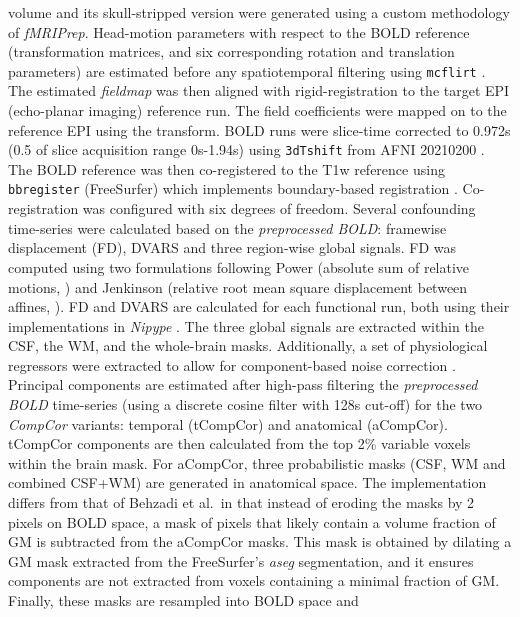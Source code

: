 \documentclass[
]{article}
\begin{document}
\begin{description}
volume and its skull-stripped version were generated using a custom
methodology of \emph{fMRIPrep}. Head-motion parameters with respect to
the BOLD reference (transformation matrices, and six corresponding
rotation and translation parameters) are estimated before any
spatiotemporal filtering using \texttt{mcflirt} \citep[FSL
6.0.4:ddd0a010,][]{mcflirt}. The estimated \emph{fieldmap} was then
aligned with rigid-registration to the target EPI (echo-planar imaging)
reference run. The field coefficients were mapped on to the reference
EPI using the transform. BOLD runs were slice-time corrected to 0.972s
(0.5 of slice acquisition range 0s-1.94s) using \texttt{3dTshift} from
AFNI 20210200 \citep[RRID:SCR\_005927]{afni}. The BOLD reference was
then co-registered to the T1w reference using \texttt{bbregister}
(FreeSurfer) which implements boundary-based registration \citep{bbr}.
Co-registration was configured with six degrees of freedom. Several
confounding time-series were calculated based on the \emph{preprocessed
BOLD}: framewise displacement (FD), DVARS and three region-wise global
signals. FD was computed using two formulations following Power
(absolute sum of relative motions, \citet{power_fd_dvars}) and Jenkinson
(relative root mean square displacement between affines,
\citet{mcflirt}). FD and DVARS are calculated for each functional run,
both using their implementations in \emph{Nipype} \citep[following the
definitions by][]{power_fd_dvars}. The three global signals are
extracted within the CSF, the WM, and the whole-brain masks.
Additionally, a set of physiological regressors were extracted to allow
for component-based noise correction \citep[\emph{CompCor},][]{compcor}.
Principal components are estimated after high-pass filtering the
\emph{preprocessed BOLD} time-series (using a discrete cosine filter
with 128s cut-off) for the two \emph{CompCor} variants: temporal
(tCompCor) and anatomical (aCompCor). tCompCor components are then
calculated from the top 2\% variable voxels within the brain mask. For
aCompCor, three probabilistic masks (CSF, WM and combined CSF+WM) are
generated in anatomical space. The implementation differs from that of
Behzadi et al.~in that instead of eroding the masks by 2 pixels on BOLD
space, a mask of pixels that likely contain a volume fraction of GM is
subtracted from the aCompCor masks. This mask is obtained by dilating a
GM mask extracted from the FreeSurfer's \emph{aseg} segmentation, and it
ensures components are not extracted from voxels containing a minimal
fraction of GM. Finally, these masks are resampled into BOLD space and

\end{description}
\end{document}

